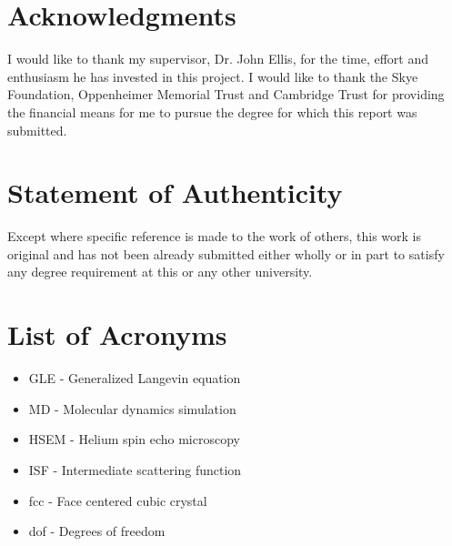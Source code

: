\documentclass[notitlepage]{report}
\begin{document}
\pagebreak

\section*{Acknowledgments}

I would like to thank my supervisor, Dr. John Ellis, for the time, effort and enthusiasm he has invested in this project.
I would like to thank the Skye Foundation, Oppenheimer Memorial Trust and Cambridge Trust for providing the financial means for me to pursue the degree for which this report was submitted.

\addvspace{2cm}

\section*{Statement of Authenticity}

Except where specific reference is made to the work of others, this work is original and has not been already submitted either wholly or in part to satisfy any degree requirement at this or any other university.

\addvspace{2cm}

\section*{List of Acronyms}

\begin{itemize}
  \item GLE - Generalized Langevin equation
  \item MD - Molecular dynamics simulation
  \item HSEM - Helium spin echo microscopy
  \item ISF - Intermediate scattering function
  \item fcc - Face centered cubic crystal
  \item dof - Degrees of freedom
\end{itemize}

\tableofcontents
\listoffigures
\listoftables










\end{document}

